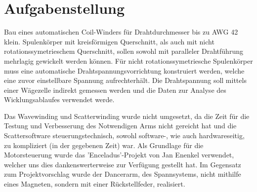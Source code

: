\section{Aufgabenstellung}
\label{sec:Aufgabenstellung}

Bau eines automatischen Coil-Winders für Drahtdurchmesser bis zu AWG 42 klein. Spulenkörper mit kreisförmigen Querschnitt, als auch mit nicht rotationssymetrieschem Querschnitt, sollen sowohl mit paralleler Drahtführung mehrlagig gewickelt werden können. Für nicht rotationssymetriesche Spulenkörper muss eine automatische Drahtspannungsvorrichtung konstruiert werden, welche eine zuvor einstellbare Spannung aufrechterhält. Die Drahtspannung soll mittels einer Wägezelle indirekt gemessen werden und die Daten zur Analyse des Wicklungsablaufes verwendet werde.

Das Wavewinding und Scatterwinding wurde nicht umgesetzt, da die Zeit für die Testung und Verbesserung des Notwendigen Arms nicht gereicht hat und die Scattersoftware steuerungstechnisch, sowohl software-, wie auch hardwareseitig, zu kompliziert (in der gegebenen Zeit) war. Als Grundlage für die Motorsteuerung wurde das 'Enceladus'-Projekt von Jan Enenkel verwendet, welcher uns dies dankenswerterweise zur Verfügung gestellt hat. Im Gegensatz zum Projektvorschlag wurde der Dancerarm, des Spannsystems, nicht mithilfe eines Magneten, sondern mit einer Rückstellfeder, realisiert.
